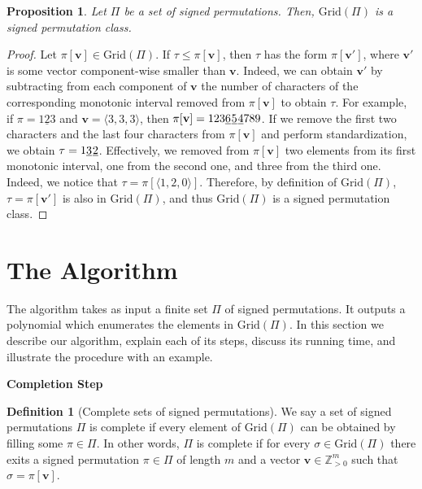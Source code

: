 \documentclass{article}
\numberwithin{equation}{section}
\newtheorem{prop}[thm]{Proposition}
\theoremstyle{definition}
\newtheorem{defn}{Definition}[section]
\newcommand{\V}{\textbf{v}}
\newcommand{\Grid}{\text{Grid}}
\begin{document}
\begin{prop}
Let $\Pi$ be a set of signed permutations. Then, $\Grid(\Pi)$ is a signed permutation class.
\end{prop} 
\begin{proof}
    Let $\pi[\V]\in\Grid(\Pi)$. If $\tau\leq\pi[\V]$, then $\tau$ has the form $\pi[\V']$, where $\V'$ is some vector component-wise smaller than $\V$. Indeed, we can obtain $\V'$ by subtracting from each component of $\V$ the number of characters of the corresponding monotonic interval removed from $\pi[\V]$ to obtain $\tau$. For example, if $\pi=1\underline{2}3$ and $\V=\langle3,3,3\rangle$, then $\pi[\V]=123\underline{6}\hspace{0.02cm}\underline{5}\hspace{0.02cm}\underline{4}789$. If we remove the first two characters and the last four characters from $\pi[\V]$ and perform standardization, we obtain $\tau=1\underline{3}\hspace{0.02cm}\underline{2}$. Effectively, we removed from $\pi[\V]$ two elements from its first monotonic interval, one from the second one, and three from the third one. Indeed, we notice that $\tau=\pi[\langle1,2,0\rangle]$. Therefore, by definition of $\Grid(\Pi)$, $\tau=\pi[\V']$ is also in $\Grid(\Pi)$, and thus $\Grid(\Pi)$ is a signed permutation class. 
\end{proof}


\section{The Algorithm}\label{sec:algorithm}


The algorithm takes as input a finite set $\Pi$ of signed permutations. It outputs a polynomial which enumerates the elements in $\Grid(\Pi)$. In this section we describe our algorithm, explain each of its steps, discuss its running time, and illustrate the procedure with an example. 



\vspace{5mm}
\noindent \textbf{\large Completion Step}

\begin{defn}[Complete sets of signed permutations]
  We say a set of signed permutations $\Pi$ is complete if every element of $\Grid(\Pi)$ can be obtained by filling some $\pi\in\Pi$. In other words, $\Pi$ is complete if for every $\sigma\in\Grid(\Pi)$ there exits a signed permutation $\pi\in \Pi$ of length $m$ and a vector $\V\in\mathbb{Z}_{>0}^m$ such that $\sigma=\pi[\V]$.
\end{defn}
\end{document}
